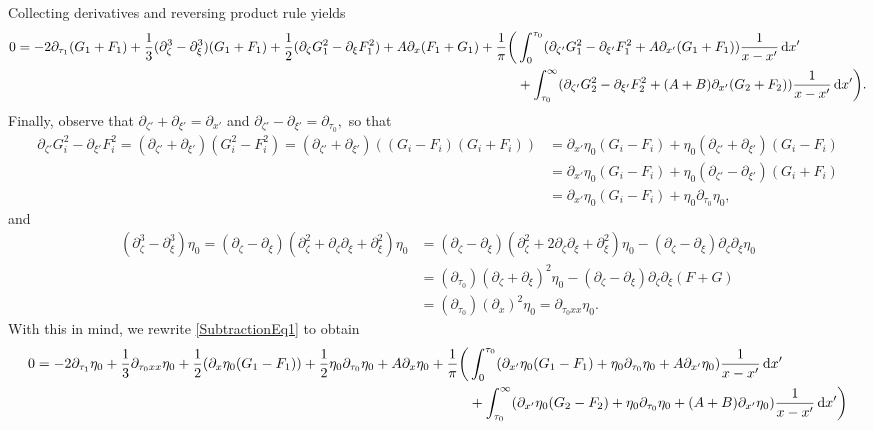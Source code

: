 \documentclass[10pt,reqno,oneside,a4paper, landscape]{article}
\begin{document}
Collecting derivatives and reversing product rule yields
\begin{equation}\label{SubtractionEq1}
\begin{aligned}
0 = - 2 \partial_{\tau_1} (G_1 + F_1)+  \frac{1}{3}( \partial_\zeta^3 - \partial_\xi^3)(G_1 + F_1)+ \frac{1}{2}(\partial_{\zeta} G_1^2 -\partial_\xi F_1^2) + A\partial_x (F_1+G_1) +  \frac{1}{\pi} \bigg(
&\int^{\tau_0}_{0} (\partial_{\zeta'} G_1^2 - \partial_{\xi'} F_1^2  + A\partial_{x'} (G_1+F_1)) \frac{1}{x-x'} \,\mathrm{d} x' \\
&+ \int^{\infty}_{\tau_0} (\partial_{\zeta'} G_2^2 - \partial_{\xi'} F_2^2 + (A+B) \partial_{x'}( G_2+F_2))\frac{1}{x -x'} \,\mathrm{d} x' \bigg).
\end{aligned}
\end{equation}
Finally, observe that $\partial_{\zeta'} + \partial_{\xi'}= \partial_{x'}$ and $\partial_{\zeta'} - \partial_{\xi'} = \partial_{\tau_0},$ so that
\begin{align*} 
\partial_{\zeta'} G_i^2 - \partial_{\xi'}F_i^2 = (\partial_{\zeta'} + \partial_{\xi'})(G_i^2 - F_i^2) =  (\partial_{\zeta'} + \partial_{\xi'})((G_i- F_i)(G_i + F_i)) &= \partial_{x'} \eta_0 (G_i - F_i) + \eta_0 (\partial_{\zeta'} + \partial_{\xi'})(G_i- F_i) \\
 &= \partial_{x'} \eta_0 (G_i - F_i) + \eta_0 (\partial_{\zeta'} - \partial_{\xi'})(G_i + F_i) \\
 &= \partial_{x'} \eta_0 (G_i - F_i) + \eta_0 \partial_{\tau_0}\eta_0,
\end{align*}
 and 
\begin{align*}
( \partial_\zeta^3 - \partial_\xi^3) \eta_0 = (\partial_\zeta - \partial_\xi)(\partial_\zeta^2 + \partial_\zeta \partial_\xi + \partial_\xi^2)\eta_0 &= (\partial_\zeta - \partial_\xi)(\partial_\zeta^2 + 2\partial_\zeta \partial_\xi + \partial_\xi^2)\eta_0 - (\partial_\zeta - \partial_\xi) \partial_\zeta \partial_\xi \eta_0\\
&= (\partial_{\tau_0})(\partial_\zeta +\partial_\xi)^2 \eta_0 - (\partial_\zeta - \partial_\xi) \partial_\zeta \partial_\xi (F+G)\\
&= (\partial_{\tau_0})(\partial_x)^2 \eta_0 = \partial_{\tau_0 xx}\eta_0.
 \end{align*}
With this in mind, we rewrite \eqref{SubtractionEq1} to obtain
\begin{align*}
0 = - 2 \partial_{\tau_1} \eta_0 +  \frac{1}{3}\partial_{\tau_0 xx}\eta_0 + \frac{1}{2}( \partial_{x} \eta_0 (G_1 - F_1)) + \frac{1}{2} \eta_0 \partial_{\tau_0}\eta_0 + A\partial_x \eta_0 +  \frac{1}{\pi} \bigg(
&\int^{\tau_0}_{0} ( \partial_{x'} \eta_0 (G_1 - F_1) + \eta_0 \partial_{\tau_0}\eta_0  + A\partial_{x'} \eta_0 ) \frac{1}{x-x'} \,\mathrm{d} x' \\
&+ \int^{\infty}_{\tau_0} ( \partial_{x'} \eta_0 (G_2 - F_2) + \eta_0 \partial_{\tau_0}\eta_0 + (A+B) \partial_{x'}\eta_0)\frac{1}{x -x'} \,\mathrm{d} x' \bigg) 
 \end{align*}
\end{document}
